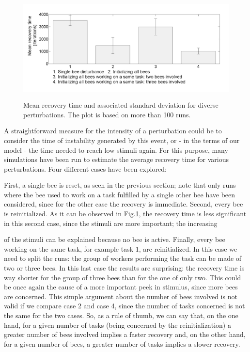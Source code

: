 \begin{center}
\begin{figure}[ht!]
\begin{centering}
\includegraphics[scale=0.35]{figures/Figure3.png}
\label{fig:figure5}
\par\end{centering}

\caption{Mean recovery time and associated standard deviation for diverse perturbations. The plot is based on more than 100 runs.}


\end{figure}

\par\end{center}

A straightforward measure for the intensity of a perturbation could
be to consider the time of instability generated by this event, or
- in the terms of our model - the time needed to reach low stimuli
again. For this purpose, many simulations have been run to estimate
the average recovery time for various perturbations. Four different
cases have been explored:

First, a single bee is reset, as seen in the previous section; note
that only runs where the bee used to work on a task fulfilled by a
single other bee have been considered, since for the other case the
recovery is immediate. Second, every bee is reinitialized. As it can
be observed in Fig.\ref{fig:figure5}, the recovery time is less significant
in this second case, since the stimuli are more important; the increasing

of the stimuli can be explained because no bee is active. Finally,
every bee working on the same task, for example task 1, are reinitialized.
In this case we need to split the runs: the group of workers performing
the task can be made of two or three bees. In this last case the results
are surprising: the recovery time is way shorter for the group of
three bees than for the one of only two. This could be once again
the cause of a more important peek in stimulus, since more bees are
concerned. This simple argument about the number of bees involved
is not valid if we compare case 2 and case 4, since the number of
tasks concerned is not the same for the two cases. So, as a rule of
thumb, we can say that, on the one hand, for a given number of tasks
(being concerned by the reinitialization) a greater number of bees
involved implies a faster recovery and, on the other hand, for a given
number of bees, a greater number of tasks implies a slower recovery.

